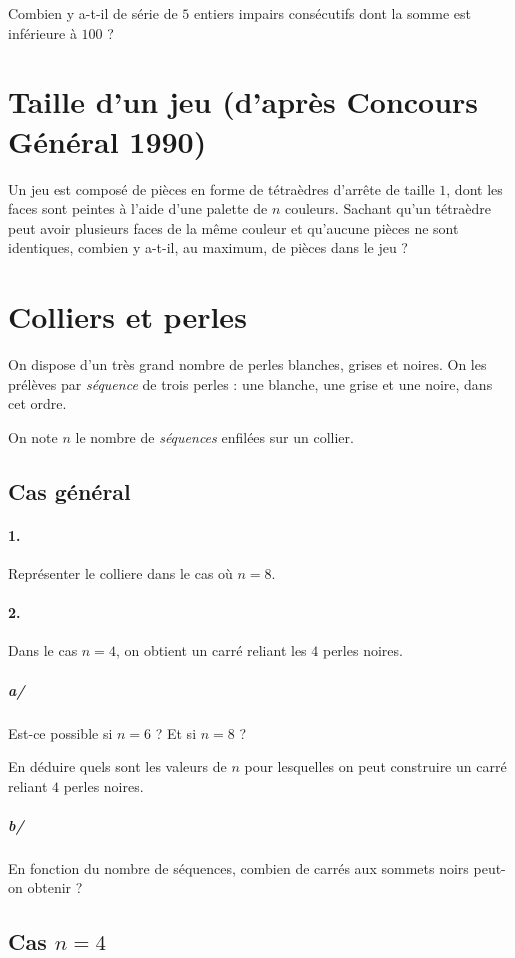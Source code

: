 			Combien y a-t-il de série de $5$ entiers impairs consécutifs dont la somme est inférieure à $100$ ?

	\section{Taille d'un jeu (d'après Concours Général 1990)}

		Un jeu est composé de pièces en forme de tétraèdres d'arrête de taille $1$, dont les faces sont peintes à l'aide d'une palette de $n$ couleurs.
		Sachant qu'un tétraèdre peut avoir plusieurs faces de la même couleur et qu'aucune pièces ne sont identiques, combien y a-t-il, au maximum, de pièces dans le jeu ?
	

	\section{Colliers et perles}

		On dispose d'un très grand nombre de perles blanches, grises et noires. On les prélèves par \textit{séquence} de trois perles : une blanche, une grise et une noire, dans cet ordre.

		On note $n$ le nombre de \textit{séquences} enfilées sur un collier.

		\subsection{Cas général}

		\paragraph{1.} Représenter le colliere dans le cas où $n=8$.

		\paragraph{2.} Dans le cas $n=4$, on obtient un carré reliant les $4$ perles noires.

			\subparagraph{a/} Est-ce possible si $n=6$ ? Et si $n=8$ ? 

			En déduire quels sont les valeurs de $n$ pour lesquelles on peut construire un carré reliant $4$ perles noires.

			\subparagraph{b/} En fonction du nombre de séquences, combien de carrés aux sommets noirs peut-on obtenir ?

		\subsection{Cas $n=4$}

